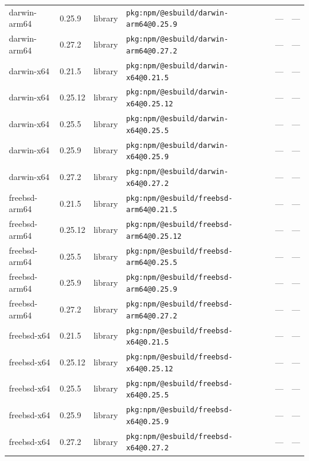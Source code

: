 \documentclass[11pt,a4paper]{article}
\begin{document}
\begin{longtable}{|p{4cm}|p{2cm}|p{1.6cm}|p{5cm}|p{1.5cm}|p{3.5cm}|}
\raggedright darwin-arm64 & 0.25.9 & library & \small\texttt{pkg:npm/@esbuild/darwin-arm64@0.25.9} & — & \small — \\
\raggedright darwin-arm64 & 0.27.2 & library & \small\texttt{pkg:npm/@esbuild/darwin-arm64@0.27.2} & — & \small — \\
\raggedright darwin-x64 & 0.21.5 & library & \small\texttt{pkg:npm/@esbuild/darwin-x64@0.21.5} & — & \small — \\
\raggedright darwin-x64 & 0.25.12 & library & \small\texttt{pkg:npm/@esbuild/darwin-x64@0.25.12} & — & \small — \\
\raggedright darwin-x64 & 0.25.5 & library & \small\texttt{pkg:npm/@esbuild/darwin-x64@0.25.5} & — & \small — \\
\raggedright darwin-x64 & 0.25.9 & library & \small\texttt{pkg:npm/@esbuild/darwin-x64@0.25.9} & — & \small — \\
\raggedright darwin-x64 & 0.27.2 & library & \small\texttt{pkg:npm/@esbuild/darwin-x64@0.27.2} & — & \small — \\
\raggedright freebsd-arm64 & 0.21.5 & library & \small\texttt{pkg:npm/@esbuild/freebsd-arm64@0.21.5} & — & \small — \\
\raggedright freebsd-arm64 & 0.25.12 & library & \small\texttt{pkg:npm/@esbuild/freebsd-arm64@0.25.12} & — & \small — \\
\raggedright freebsd-arm64 & 0.25.5 & library & \small\texttt{pkg:npm/@esbuild/freebsd-arm64@0.25.5} & — & \small — \\
\raggedright freebsd-arm64 & 0.25.9 & library & \small\texttt{pkg:npm/@esbuild/freebsd-arm64@0.25.9} & — & \small — \\
\raggedright freebsd-arm64 & 0.27.2 & library & \small\texttt{pkg:npm/@esbuild/freebsd-arm64@0.27.2} & — & \small — \\
\raggedright freebsd-x64 & 0.21.5 & library & \small\texttt{pkg:npm/@esbuild/freebsd-x64@0.21.5} & — & \small — \\
\raggedright freebsd-x64 & 0.25.12 & library & \small\texttt{pkg:npm/@esbuild/freebsd-x64@0.25.12} & — & \small — \\
\raggedright freebsd-x64 & 0.25.5 & library & \small\texttt{pkg:npm/@esbuild/freebsd-x64@0.25.5} & — & \small — \\
\raggedright freebsd-x64 & 0.25.9 & library & \small\texttt{pkg:npm/@esbuild/freebsd-x64@0.25.9} & — & \small — \\
\raggedright freebsd-x64 & 0.27.2 & library & \small\texttt{pkg:npm/@esbuild/freebsd-x64@0.27.2} & — & \small — \\

\end{longtable}
\end{document}
